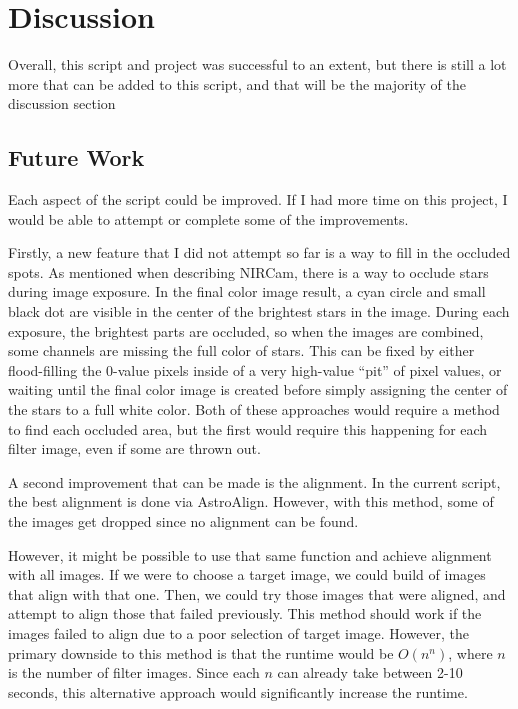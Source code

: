 \documentclass[10pt,twocolumn,letterpaper]{article}
\begin{document}
\section{Discussion}
\label{sec:disc}

Overall, this script and project was successful to an extent, but there is still a lot more that can be added to this script, and that will be the majority of the discussion section

\subsection{Future Work}

Each aspect of the script could be improved. If I had more time on this project, I would be able to attempt or complete some of the improvements.

Firstly, a new feature that I did not attempt so far is a way to fill in the occluded spots. As mentioned when describing NIRCam, there is a way to occlude stars during image exposure. In the final color image result, a cyan circle and small black dot are visible in the center of the brightest stars in the image. During each exposure, the brightest parts are occluded, so when the images are combined, some channels are missing the full color of stars. This can be fixed by either flood-filling the 0-value pixels inside of a very high-value ``pit'' of pixel values, or waiting until the final color image is created before simply assigning the center of the stars to a full white color. Both of these approaches would require a method to find each occluded area, but the first would require this happening for each filter image, even if some are thrown out.

A second improvement that can be made is the alignment. In the current script, the best alignment is done via AstroAlign. However, with this method, some of the images get dropped since no alignment can be found.

However, it might be possible to use that same function and achieve alignment with all images. If we were to choose a target image, we could build of images that align with that one. Then, we could try those images that were aligned, and attempt to align those that failed previously. This method should work if the images failed to align due to a poor selection of target image. However, the primary downside to this method is that the runtime would be $O(n^n)$, where $n$ is the number of filter images. Since each $n$ can already take between 2-10 seconds, this alternative approach would significantly increase the runtime.
\end{document}
